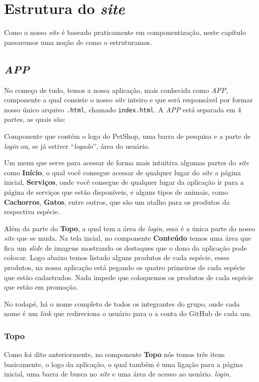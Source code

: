 \chapter{Estrutura do \emph{site}}
Como o nosso \emph{site} é baseado praticamente em componentização, neste
capítulo passaremos uma noção de como o estruturamos.

\section{\emph{APP}}
No começo de tudo, temos a nossa aplicação, mais conhecida como \emph{APP},
componente a qual consiste o nosso \emph{site} inteiro e que será responsável
por formar nosso único arquivo \texttt{.html}, chamado \texttt{index.html}. A
\emph{APP} está separada em 4 partes, as quais são:
	\begin{description}[style=nextline]
		\item[Topo] Componente que contém o logo do PetShop, uma barra de
pesquisa e a parte de \emph{login} ou, se já estiver “\emph{logado}”, área do
usuário.
		\item[\emph{Navbar}] Um menu que serve para acessar de forma mais
intuitiva algumas partes do \emph{site} como \textbf{Início}, o qual você
consegue acessar de qualquer lugar do \emph{site} a página inicial,
\textbf{Serviços}, onde você consegue de qualquer lugar da aplicação ir para a
página de serviços que estão disponíveis, e alguns tipos de animais, como
\textbf{Cachorros}, \textbf{Gatos}, entre outros, que são um atalho para os
produtos da respectiva espécie.
		\item[Conteúdo] Além da parte do \textbf{Topo}, a qual tem a área de
\emph{login}, essa é a única parte do nosso \emph{site} que se muda. Na tela
incial, no componente \textbf{Conteúdo} temos uma área que fica um \emph{slide}
de imagens mostrando os destaques que o dono da aplicação pode colocar. Logo
abaixo temos listado alguns produtos de cada espécie, esses produtos, na nossa
aplicação está pegando os quatro primeiros de cada espécie que estão
cadastrados. Nada impede que coloquemos os produtos de cada espécie que estão em
promoção.
		\item[Rodapé] No rodapé, há o nome completo de todos os integrantes do
grupo, onde cada nome é um \emph{link} que redireciona o usuário para o a conta
do GitHub de cada um.
	\end{description}

\subsection{Topo}
Como foi dito anteriormente, no componente \textbf{Topo} nós temos três itens
basicamente, o logo da aplicação, o qual também é uma ligação para a página
inicial, uma barra de busca no \emph{site} e uma área de acesso ao usuário.
\emph{login}.
